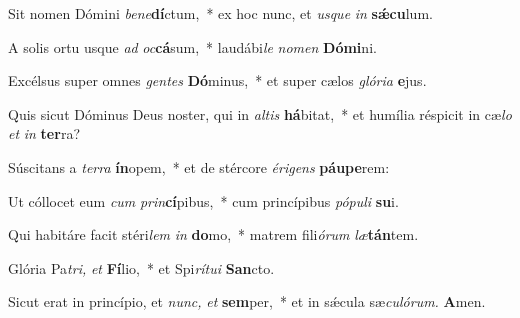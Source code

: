 \item Sit nomen Dómini \textit{be}\textit{ne}\textbf{dí}ctum,~* ex hoc nunc, et \textit{usque} \textit{in} \textbf{sǽcu}lum.
\item A solis ortu usque \textit{ad} \textit{oc}\textbf{cá}sum,~* laudábi\tinyhspace\textit{le} \textit{nomen} \textbf{Dómi}ni.
\item Excélsus super omnes \textit{gentes} \textbf{Dó}minus,~* et super cælos \textit{glória} \textbf{e}jus.
\item Quis sicut Dóminus Deus noster, qui in \textit{altis} \textbf{há}bitat,~* et humília réspicit in cæ\tinyhspace\textit{lo} \textit{et} \textit{in} \textbf{ter}ra?
\item Súscitans a \textit{terra} \textbf{ín}opem,~* et de stércore \textit{érigens} \textbf{páu}\textbf{pe}rem:
\item Ut cóllocet eum \textit{cum} \textit{prin}\textbf{cí}pibus,~* cum princípibus \textit{pópuli} \textbf{su}i.
\item Qui habitáre facit stéri\tinyhspace\textit{lem} \textit{in} \textbf{do}mo,~* matrem fili\tinyhspace\textit{órum} \textit{læ}\textbf{tán}tem.
\item Glória Pa\tinyhspace\textit{tri,} \textit{et} \textbf{Fí}lio,~* et Spi\tinyhspace\textit{rítui} \textbf{San}cto.
\item Sicut erat in princípio, et \textit{nunc,} \textit{et} \textbf{sem}per,~* et in sǽcula sæ\tinyhspace\textit{culórum.} \textbf{A}men.